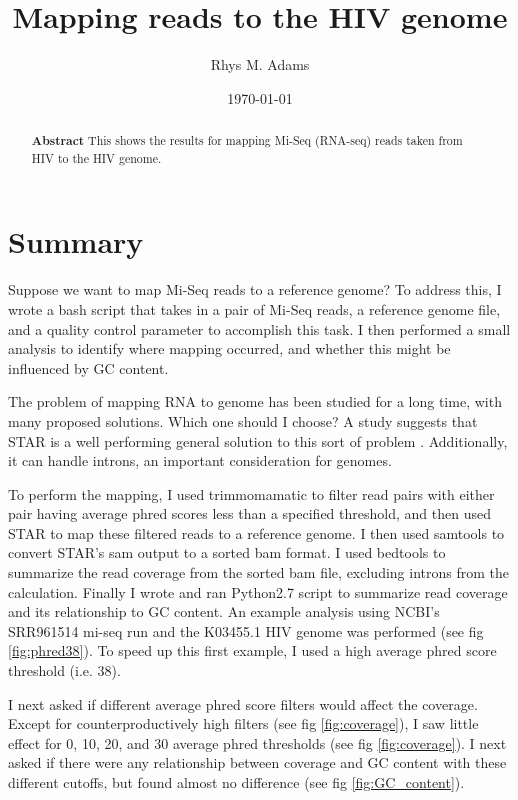 \documentclass[article]{revtex4}
\begin{document}
\title{Mapping reads to the HIV genome}
\author{Rhys M. Adams}
\date{\today}

\begin{abstract}
\textbf{Abstract}
This shows the results for mapping Mi-Seq (RNA-seq) reads taken from HIV to the HIV genome. 
\end{abstract}

\maketitle

\section{Summary}
Suppose we want to map Mi-Seq reads to a reference genome? To address this, I wrote a bash script that takes in a pair of Mi-Seq reads, a reference genome file, and a quality control parameter to accomplish this task. I then performed a small analysis to identify where mapping occurred, and whether this might be influenced by GC content.

The problem of mapping RNA to genome has been studied for a long time, with many proposed solutions. Which one should I choose? A study suggests that STAR is a well performing general solution to this sort of problem \cite{engstrom_systematic_2013}. Additionally, it can handle introns, an important consideration for genomes.

To perform the mapping, I used trimmomamatic to filter read pairs with either pair having average phred scores less than a specified threshold, and then used STAR to map these filtered reads to a reference genome. I then used samtools to convert STAR's sam output to a sorted bam format. I used bedtools to summarize the read coverage from the sorted bam file, excluding introns from the calculation. Finally I wrote and ran Python2.7 script to summarize read coverage and its relationship to GC content. An example analysis using NCBI's SRR961514 mi-seq run and the K03455.1 HIV genome was performed (see fig \ref{fig:phred38}). To speed up this first example, I used a high average phred score threshold (i.e. 38).

I next asked if different average phred score filters would affect the coverage. Except for counterproductively high filters (see fig \ref{fig:coverage}), I saw little effect for 0, 10, 20, and 30 average phred thresholds (see fig \ref{fig:coverage}). I next asked if there were any relationship between coverage and GC content with these different cutoffs, but found almost no difference (see fig \ref{fig:GC_content}).
\end{document}
